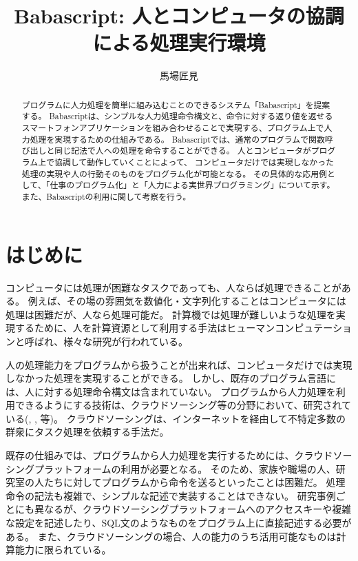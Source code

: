 \documentclass[twoside]{wiss}
\begin{document}
\title{Babascript: 人とコンピュータの協調による処理実行環境}
\etitle{} %

\author{{馬場匠見}\affil[1]}


\begin{abstract}

プログラムに人力処理を簡単に組み込むことのできるシステム「Babascript」を提案する。
Babascriptは、シンプルな人力処理命令構文と、命令に対する返り値を返せるスマートフォンアプリケーションを組み合わせることで実現する、プログラム上で人力処理を実現するための仕組みである。
Babascriptでは、通常のプログラムで関数呼び出しと同じ記法で人への処理を命令することができる。
人とコンピュータがプログラム上で協調して動作していくことによって、
コンピュータだけでは実現しなかった処理の実現や人の行動そのものをプログラム化が可能となる。
その具体的な応用例として、「仕事のプログラム化」と「人力による実世界プログラミング」について示す。
また、Babascriptの利用に関して考察を行う。

\end{abstract}

\maketitle


\section{はじめに}
コンピュータには処理が困難なタスクであっても、人ならば処理できることがある。
例えば、その場の雰囲気を数値化・文字列化することはコンピュータには処理は困難だが、人なら処理可能だ。
計算機では処理が難しいような処理を実現するために、人を計算資源として利用する手法はヒューマンコンピュテーション\cite{humancomputation}と呼ばれ、様々な研究が行われている。

人の処理能力をプログラムから扱うことが出来れば、コンピュータだけでは実現しなかった処理を実現することができる。
しかし、既存のプログラム言語には、人に対する処理命令構文は含まれていない。
プログラムから人力処理を利用できるようにする技術は、クラウドソーシング等の分野において、研究されている(\cite{automan}, \cite{crowddb}, \cite{crowdforge}等)。
クラウドソーシングは、インターネットを経由して不特定多数の群衆にタスク処理を依頼する手法だ\cite{riseofcrowdsourcing}。

既存の仕組みでは、プログラムから人力処理を実行するためには、クラウドソーシングプラットフォームの利用が必要となる。
そのため、家族や職場の人、研究室の人たちに対してプログラムから命令を送るといったことは困難だ。
処理命令の記法も複雑で、シンプルな記述で実装することはできない。
研究事例ごとにも異なるが、クラウドソーシングプラットフォームへのアクセスキーや複雑な設定を記述したり、SQL文のようなものをプログラム上に直接記述する必要がある。
また、クラウドソーシングの場合、人の能力のうち活用可能なものは計算能力に限られている。
\end{document}
